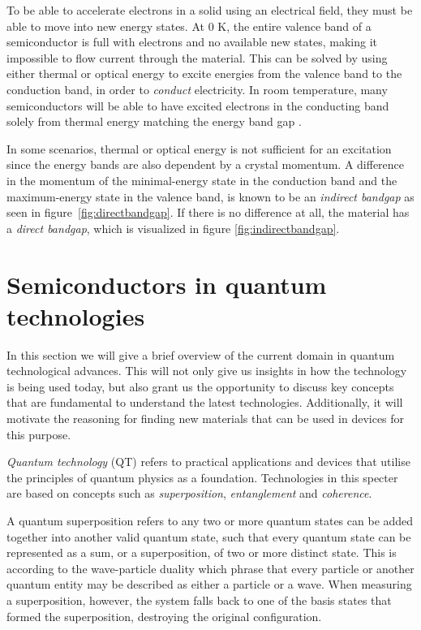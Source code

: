 To be able to accelerate electrons in a solid using an electrical field, they must be able to move into new energy states. At $0$ K, the entire valence band of a semiconductor is full with electrons and no available new states, making it impossible to flow current through the material. This can be solved by using either thermal or optical energy to excite energies from the valence band to the conduction band, in order to \textit{conduct} electricity. In room temperature, many semiconductors will be able to have excited electrons in the conducting band solely from thermal energy matching the energy band gap \cite{BenStreetman2015}.

In some scenarios, thermal or optical energy is not sufficient for an excitation since the energy bands are also dependent by a crystal momentum. A difference in the momentum of the minimal-energy state in the conduction band and the maximum-energy state in the valence band, is known to be an \textit{indirect bandgap} as seen in figure \ref{fig:directbandgap}. If there is no difference at all, the material has a \textit{direct bandgap}, which is visualized in figure \ref{fig:indirectbandgap}.

\section{Semiconductors in quantum technologies}

In this section we will give a brief overview of the current domain in quantum technological advances. This will not only give us insights in how the technology is being used today, but also grant us the opportunity to discuss key concepts that are fundamental to understand the latest technologies. Additionally, it will motivate the reasoning for finding new materials that can be used in devices for this purpose.

\textit{Quantum technology} (QT) refers to practical applications and devices that utilise the principles of quantum physics as a foundation. Technologies in this specter are based on concepts such as \textit{superposition}, \textit{entanglement} and \textit{coherence}.

A quantum superposition refers to any two or more quantum states can be added together into another valid quantum state, such that every quantum state can be represented as a sum, or a superposition, of two or more distinct state. This is according to the wave-particle duality which phrase that every particle or another quantum entity may be described as either a particle or a wave. When measuring a superposition, however, the system falls back to one of the basis states that formed the superposition, destroying the original configuration.

